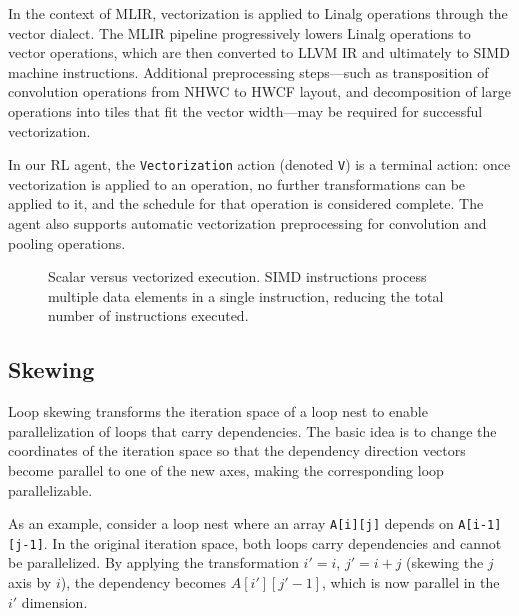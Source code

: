 In the context of MLIR, vectorization is applied to Linalg operations through the vector dialect. The MLIR pipeline progressively lowers Linalg operations to vector operations, which are then converted to LLVM IR and ultimately to SIMD machine instructions. Additional preprocessing steps—such as transposition of convolution operations from NHWC to HWCF layout, and decomposition of large operations into tiles that fit the vector width—may be required for successful vectorization.

In our RL agent, the \texttt{Vectorization} action (denoted \texttt{V}) is a terminal action: once vectorization is applied to an operation, no further transformations can be applied to it, and the schedule for that operation is considered complete. The agent also supports automatic vectorization preprocessing for convolution and pooling operations.

\begin{figure}[H]
    \centering
    \caption{Scalar versus vectorized execution. SIMD instructions process multiple data elements in a single instruction, reducing the total number of instructions executed.}
    \label{fig:vectorization}
\end{figure}

\subsection{Skewing}

Loop skewing transforms the iteration space of a loop nest to enable parallelization of loops that carry dependencies. The basic idea is to change the coordinates of the iteration space so that the dependency direction vectors become parallel to one of the new axes, making the corresponding loop parallelizable.

As an example, consider a loop nest where an array \texttt{A[i][j]} depends on \texttt{A[i-1][j-1]}. In the original iteration space, both loops carry dependencies and cannot be parallelized. By applying the transformation $i' = i$, $j' = i + j$ (skewing the $j$ axis by $i$), the dependency becomes $A[i'][j'-1]$, which is now parallel in the $i'$ dimension.

